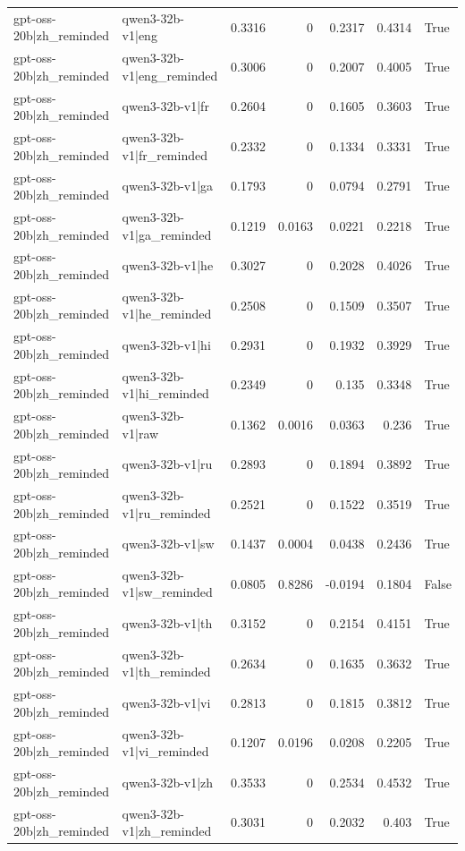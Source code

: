 \begin{table}
\begin{tabular}{l l r r r r l}
gpt-oss-20b|zh_reminded & qwen3-32b-v1|eng & 0.3316 & 0 & 0.2317 & 0.4314 & True \\
gpt-oss-20b|zh_reminded & qwen3-32b-v1|eng_reminded & 0.3006 & 0 & 0.2007 & 0.4005 & True \\
gpt-oss-20b|zh_reminded & qwen3-32b-v1|fr & 0.2604 & 0 & 0.1605 & 0.3603 & True \\
gpt-oss-20b|zh_reminded & qwen3-32b-v1|fr_reminded & 0.2332 & 0 & 0.1334 & 0.3331 & True \\
gpt-oss-20b|zh_reminded & qwen3-32b-v1|ga & 0.1793 & 0 & 0.0794 & 0.2791 & True \\
gpt-oss-20b|zh_reminded & qwen3-32b-v1|ga_reminded & 0.1219 & 0.0163 & 0.0221 & 0.2218 & True \\
gpt-oss-20b|zh_reminded & qwen3-32b-v1|he & 0.3027 & 0 & 0.2028 & 0.4026 & True \\
gpt-oss-20b|zh_reminded & qwen3-32b-v1|he_reminded & 0.2508 & 0 & 0.1509 & 0.3507 & True \\
gpt-oss-20b|zh_reminded & qwen3-32b-v1|hi & 0.2931 & 0 & 0.1932 & 0.3929 & True \\
gpt-oss-20b|zh_reminded & qwen3-32b-v1|hi_reminded & 0.2349 & 0 & 0.135 & 0.3348 & True \\
gpt-oss-20b|zh_reminded & qwen3-32b-v1|raw & 0.1362 & 0.0016 & 0.0363 & 0.236 & True \\
gpt-oss-20b|zh_reminded & qwen3-32b-v1|ru & 0.2893 & 0 & 0.1894 & 0.3892 & True \\
gpt-oss-20b|zh_reminded & qwen3-32b-v1|ru_reminded & 0.2521 & 0 & 0.1522 & 0.3519 & True \\
gpt-oss-20b|zh_reminded & qwen3-32b-v1|sw & 0.1437 & 0.0004 & 0.0438 & 0.2436 & True \\
gpt-oss-20b|zh_reminded & qwen3-32b-v1|sw_reminded & 0.0805 & 0.8286 & -0.0194 & 0.1804 & False \\
gpt-oss-20b|zh_reminded & qwen3-32b-v1|th & 0.3152 & 0 & 0.2154 & 0.4151 & True \\
gpt-oss-20b|zh_reminded & qwen3-32b-v1|th_reminded & 0.2634 & 0 & 0.1635 & 0.3632 & True \\
gpt-oss-20b|zh_reminded & qwen3-32b-v1|vi & 0.2813 & 0 & 0.1815 & 0.3812 & True \\
gpt-oss-20b|zh_reminded & qwen3-32b-v1|vi_reminded & 0.1207 & 0.0196 & 0.0208 & 0.2205 & True \\
gpt-oss-20b|zh_reminded & qwen3-32b-v1|zh & 0.3533 & 0 & 0.2534 & 0.4532 & True \\
gpt-oss-20b|zh_reminded & qwen3-32b-v1|zh_reminded & 0.3031 & 0 & 0.2032 & 0.403 & True \\

\end{tabular}
\end{table}
